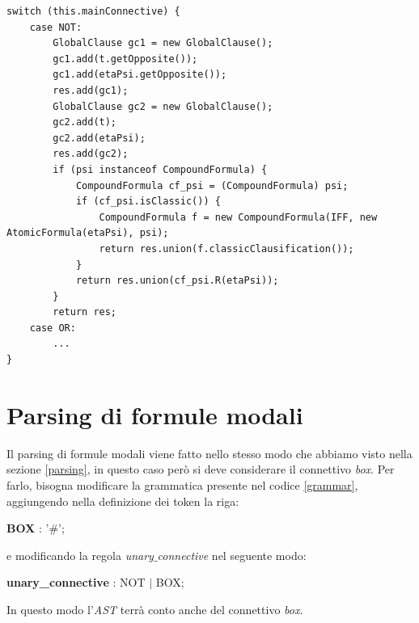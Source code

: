 \documentclass[a4paper,12pt]{report}
\begin{document}
\begin{minipage}{\linewidth}
    \small
    \begin{lstlisting}[caption={Parte del metodo \texttt{R} della classe \texttt{CompoundFormula}}, label={R}]
switch (this.mainConnective) {
    case NOT:
        GlobalClause gc1 = new GlobalClause();
        gc1.add(t.getOpposite());
        gc1.add(etaPsi.getOpposite());
        res.add(gc1);
        GlobalClause gc2 = new GlobalClause();
        gc2.add(t);
        gc2.add(etaPsi);
        res.add(gc2);
        if (psi instanceof CompoundFormula) {
            CompoundFormula cf_psi = (CompoundFormula) psi;
            if (cf_psi.isClassic()) {
                CompoundFormula f = new CompoundFormula(IFF, new AtomicFormula(etaPsi), psi);
                return res.union(f.classicClausification());
            }
            return res.union(cf_psi.R(etaPsi));
        }
        return res;
    case OR:
        ...
}
    \end{lstlisting}
\end{minipage}

\section*{Parsing di formule modali}
Il parsing di formule modali viene fatto nello stesso modo che abbiamo visto nella sezione \ref{parsing}, in questo caso però si deve considerare il connettivo \emph{box}. Per farlo, bisogna modificare la grammatica presente nel codice \ref{grammar}, aggiungendo nella definizione dei token la riga:
\begin{center}
    \textbf{BOX} : '$\#$';
\end{center}
e modificando la regola \emph{unary$\_$connective} nel seguente modo:
\begin{center}
    \textbf{unary\_connective} : NOT $|$  BOX;
\end{center}
In questo modo l'\emph{AST} terrà conto anche del connettivo \emph{box}.
\end{document}
